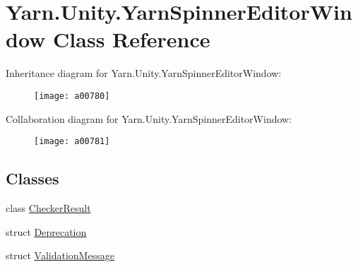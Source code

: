 \hypertarget{a00180}{\section{Yarn.\-Unity.\-Yarn\-Spinner\-Editor\-Window Class Reference}
\label{a00180}
}


Inheritance diagram for Yarn.\-Unity.\-Yarn\-Spinner\-Editor\-Window\-:
\nopagebreak
\begin{figure}[H]
\begin{center}
\leavevmode
\texttt{[image: a00780]}
\end{center}
\end{figure}


Collaboration diagram for Yarn.\-Unity.\-Yarn\-Spinner\-Editor\-Window\-:
\nopagebreak
\begin{figure}[H]
\begin{center}
\leavevmode
\texttt{[image: a00781]}
\end{center}
\end{figure}
\subsection*{Classes}
\begin{DoxyCompactItemize}
\item 
class \hyperlink{a00043}{Checker\-Result}
\item 
struct \hyperlink{a00084}{Deprecation}
\item 
struct \hyperlink{a00180_a00371}{Validation\-Message}
\end{DoxyCompactItemize}
